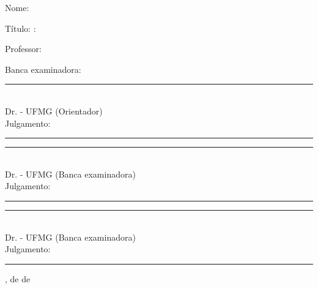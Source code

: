 %	
%	
%	
%

\newcommand{\banca}[2]{
	\noindent\rule{.6\textwidth}{.5pt}\\
	Dr. {\orientador} - UFMG (#2)\\
	Julgamento:\rule{.3\textwidth}{.5pt}
}

\clearpage

Nome: \autor

\vfill

Título: \titulo%
\if\subtitulo\empty\else:\ \fi%
\subtitulo

\vfill

\begin{adjustwidth}{8cm}{}
%

	\noindent\natureza

	\vspace{1em}

	\noindent Professor: \professor
\end{adjustwidth}

\vfill

\begin{center}
	Banca examinadora:
\end{center}

\vfill

\banca{\orientador}{Orientador}

\vfill

\banca{\membroum}{Banca examinadora}

\vfill

\banca{\membrodois}{Banca examinadora}

\vfill

\begin{center}
	\cidade, {\dia} de {\mes} de {\ano}
\end{center}
